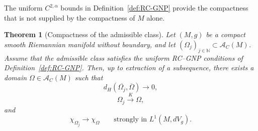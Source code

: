 \documentclass{article}
\newtheorem{theorem}{Theorem}[section]
\begin{document}
The uniform $C^{2,\alpha}$ bounds in Definition~\ref{def:RC-GNP}
provide the compactness that is not supplied by the compactness of $M$
alone.

\begin{theorem}[Compactness of the admissible class]
\label{thm:compactness-admissible}
Let $(M,g)$ be a compact smooth Riemannian manifold without boundary,
and let $(\Omega_j)_{j\in\mathbb N}\subset\mathcal A_C(M)$.
Assume that the admissible class satisfies the uniform RC--GNP
conditions of Definition~\ref{def:RC-GNP}. Then, up to extraction of
a subsequence, there exists a domain
$\Omega\in\mathcal A_C(M)$ such that
\begin{equation}
d_H(\overline{\Omega_j},\overline{\Omega})\longrightarrow0,
\label{eq:compactness-Hausdorff}
\end{equation}
\begin{equation}
\Omega_j\overset{K}{\longrightarrow}\Omega,
\label{eq:compactness-K}
\end{equation}
and
\begin{equation}
\chi_{\Omega_j}\longrightarrow\chi_\Omega
\qquad\text{strongly in }L^1(M,dV_g).
\label{eq:compactness-L1}
\end{equation}
\end{theorem}
\end{document}
